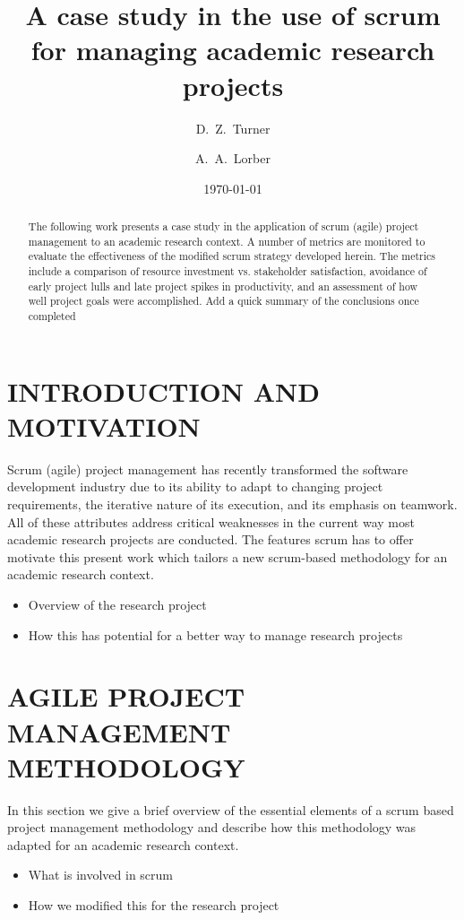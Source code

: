 \documentclass[11pt]{amsart}
\title{A case study in the use of scrum for managing academic research projects}
\author{D.~Z.~Turner}
\author{A.~A.~Lorber}
\date{\today}
\begin{document}
\begin{abstract}
The following work presents a case study in the application of scrum (agile) project management to an academic research context. A number of metrics are monitored to evaluate the effectiveness of the modified scrum strategy developed herein. The metrics include a comparison of resource investment vs. stakeholder satisfaction, avoidance of early project lulls and late project spikes in productivity, and an assessment of how well project goals were accomplished.
{\color{red}Add a quick summary of the conclusions once completed}
\end{abstract}


\maketitle

\section{INTRODUCTION AND MOTIVATION}
Scrum (agile) project management has recently transformed the software development industry due to its ability to adapt to changing project requirements, the iterative nature of its execution, and its emphasis on teamwork. All of these attributes address critical weaknesses in the current way most academic research projects are conducted. The features scrum has to offer motivate this present work which tailors a new scrum-based methodology for an academic research context.
\begin{itemize}
\item Overview of the research project
\item How this has potential for a better way to manage research projects
\end{itemize}
\section{AGILE PROJECT MANAGEMENT METHODOLOGY}
In this section we give a brief overview of the essential elements of a scrum based project management methodology and describe how this methodology was adapted for an academic research context.
\begin{itemize}
\item What is involved in scrum
\item How we modified this for the research project
\end{itemize}
\end{document}
